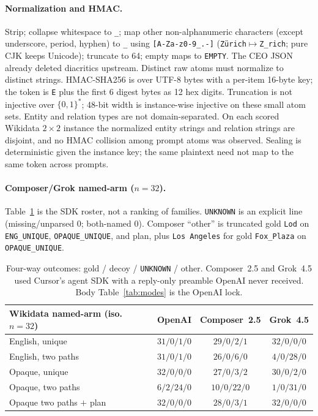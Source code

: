 \documentclass{article}
\begin{document}
\paragraph{Normalization and HMAC.}
Strip; collapse whitespace to \texttt{\_}; map other non-alphanumeric
characters (except underscore, period, hyphen) to \texttt{\_} using
\verb|[A-Za-z0-9_.-]| (\texttt{Z\"{u}rich}$\mapsto$\texttt{Z\_rich}; pure
CJK keeps Unicode); truncate to 64; empty maps to \texttt{EMPTY}.
The CEO JSON already deleted diacritics upstream. Distinct raw atoms must
normalize to distinct strings. HMAC-SHA256 is over UTF-8 bytes with a
per-item 16-byte key; the token is \texttt{E} plus the first 6 digest bytes
as 12 hex digits. Truncation is not injective over $\{0,1\}^{\ast}$;
48-bit width is instance-wise injective on these small atom sets.
Entity and relation types are not domain-separated. On each scored
Wikidata $2{\times}2$ instance the normalized entity strings and relation
strings are disjoint, and no HMAC collision among prompt atoms was
observed. Sealing is deterministic given the instance key; the same
plaintext need not map to the same token across prompts.

\paragraph{Composer/Grok named-arm ($n{=}32$).}
Table~\ref{tab:threeway} is the SDK roster, not a ranking of families.
\texttt{UNKNOWN} is an explicit line (missing/unparsed $0$; both-named $0$).
Composer ``other'' is truncated gold \texttt{Lod} on
\texttt{ENG\_UNIQUE}, \texttt{OPAQUE\_UNIQUE}, and plan, plus
\texttt{Los Angeles} for gold \texttt{Fox\_Plaza} on
\texttt{OPAQUE\_UNIQUE}.

\begin{table}[htbp]
\centering
\small
\setlength{\tabcolsep}{3.5pt}
\begin{tabular}{@{}lccc@{}}
\toprule
Wikidata named-arm (iso.\ $n{=}32$) & OpenAI & Composer~2.5 & Grok~4.5 \\
\midrule
English, unique & $31/0/1/0$ & $29/0/2/1$ & $32/0/0/0$ \\
English, two paths & $31/0/1/0$ & $26/0/6/0$ & $4/0/28/0$ \\
Opaque, unique & $32/0/0/0$ & $27/0/3/2$ & $30/0/2/0$ \\
Opaque, two paths & $6/2/24/0$ & $10/0/22/0$ & $1/0/31/0$ \\
Opaque two paths $+$ plan & $32/0/0/0$ & $28/0/3/1$ & $32/0/0/0$ \\
\bottomrule
\end{tabular}
\caption{Four-way outcomes: gold / decoy / \texttt{UNKNOWN} / other.
Composer~2.5 and Grok~4.5 used Cursor's agent SDK with a reply-only preamble
OpenAI never received. Body Table~\ref{tab:modes} is the OpenAI lock.}
\label{tab:threeway}
\end{table}
\end{document}
